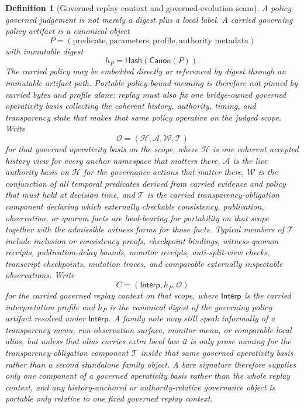 \documentclass[11pt]{article}
\newtheorem{definition}{Definition}
\newcommand{\Interp}{\mathsf{Interp}}
\newcommand{\Canon}{\mathsf{Canon}}
\newcommand{\Window}{\mathcal{W}}
\begin{document}
\begin{definition}[Governed replay context and governed-evolution seam]
A policy-governed judgement is not merely a digest plus a local label.
A carried governing policy artifact is a canonical object
\[
P=(\text{predicate},\text{parameters},\text{profile},\text{authority metadata})
\]
with immutable digest
\[
h_P=\mathsf{Hash}(\Canon(P)).
\]
The carried policy may be embedded directly or referenced by digest through an immutable artifact path.
Portable policy-bound meaning is therefore not pinned by carried bytes and profile alone: replay must also fix one bridge-owned \emph{governed operativity basis} collecting the coherent history, authority, timing, and transparency state that makes that same policy operative on the judged scope.
Write
\[
\mathcal{O}=(\mathcal{H},\mathcal{A},\Window,\mathcal{T})
\]
for that governed operativity basis on the scope, where $\mathcal{H}$ is one coherent accepted history view for every anchor namespace that matters there, $\mathcal{A}$ is the live authority basis on $\mathcal{H}$ for the governance actions that matter there, $\Window$ is the conjunction of all temporal predicates derived from carried evidence and policy that must hold at decision time, and $\mathcal{T}$ is the carried transparency-obligation component declaring which externally checkable consistency, publication, observation, or quorum facts are load-bearing for portability on that scope together with the admissible witness forms for those facts.
Typical members of $\mathcal{T}$ include inclusion or consistency proofs, checkpoint bindings, witness-quorum receipts, publication-delay bounds, monitor receipts, anti-split-view checks, transcript checkpoints, mutation traces, and comparable externally inspectable observations.
Write
\[
C=(\Interp,h_P,\mathcal{O})
\]
for the carried governed replay context on that scope, where $\Interp$ is the carried interpretation profile and $h_P$ is the canonical digest of the governing policy artifact resolved under $\Interp$.
A family note may still speak informally of a transparency menu, run-observation surface, monitor menu, or comparable local alias, but unless that alias carries extra local law it is only prose naming for the transparency-obligation component $\mathcal{T}$ inside that same governed operativity basis rather than a second standalone family object.
A bare signature therefore supplies only one component of a governed operativity basis rather than the whole replay context, and any history-anchored or authority-relative governance object is portable only relative to one fixed governed replay context.


\end{definition}
\end{document}
